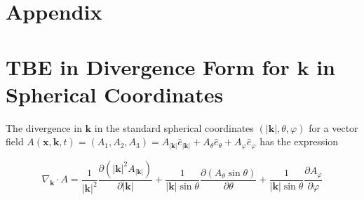 \documentclass[11pt]{article}
\newcommand{\bk}{\mathbf{k}}
\newcommand{\bx}{\mathbf{x}}
\begin{document}
\section{Appendix}
%
\appendix

\section{TBE in Divergence Form for $\bk$ in Spherical Coordinates}
The divergence in $\bk$ in the standard spherical coordinates 
$(|\bk|,\theta,\varphi)$ for a vector field $A(\bx,\bk,t) = (A_1,A_2,A_3) = A_{|\bk|} \hat{e}_{|\bk|} 
+ A_{\theta} \hat{e}_{\theta} + A_{\varphi} \hat{e}_{\varphi} $ has the expression

\begin{equation} \label{DivSpherStd}
 \nabla_{\bk} \cdot A = \frac{1}{|\bk|^2} 
 \frac{\partial ( |\bk|^2 A_{|\bk|} )}{\partial |\bk|} + 
 \frac{1}{|\bk| \sin \theta} 
 \frac{\partial \left( A_{\theta} \sin \theta \right) }{\partial \theta} 
 + \frac{1}{|\bk| \sin \theta } \frac{\partial A_{\varphi}}{\partial \varphi}
\end{equation}
\end{document}
